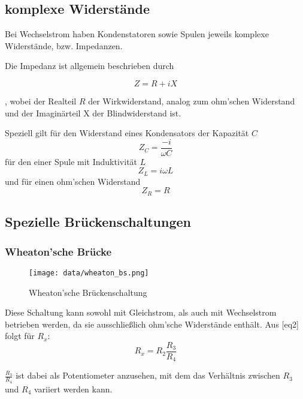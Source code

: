 \subsection{komplexe Widerstände}

Bei Wechselstrom haben Kondenstatoren sowie Spulen jeweils komplexe Widerstände, bzw. Impedanzen.

Die Impedanz ist allgemein beschrieben durch

\begin{equation}
    Z = R + iX
\end{equation}

, wobei der Realteil $R$ der Wirkwiderstand, analog zum ohm'schen Widerstand und  der Imaginärteil
X der Blindwiderstand ist. 

Speziell gilt für den Widerstand eines Kondensators der Kapazität $C$ \begin{equation}
    Z_C = \frac{-i}{\omega C}
\end{equation} für den einer Spule mit Induktivität $L$ \begin{equation}
    Z_L = i\omega L
\end{equation} und für einen ohm'schen Widerstand \begin{equation}
    Z_R = R
\end{equation}

\subsection{Spezielle Brückenschaltungen}

\subsubsection{Wheaton'sche Brücke}
\begin{figure}
\centering
\texttt{[image: data/wheaton\_bs.png]}
\caption{Wheaton'sche Brückenschaltung}
\label{fig:wheaton}
\end{figure}
Diese Schaltung kann sowohl mit Gleichstrom, als auch mit Wechselstrom betrieben werden, da sie ausschließlich
ohm'sche Widerstände enthält. 
Aus [eq2] folgt für $R_x$:
\begin{equation}
\label{eqn:wheaton}
 R_x = R_2 \frac{R_3}{R_4}
\end{equation}

$\frac{R_3}{R_4}$ ist dabei als Potentiometer anzusehen, mit dem das Verhältnis zwischen $R_3$ und $R_4$ 
variiert werden kann. 

